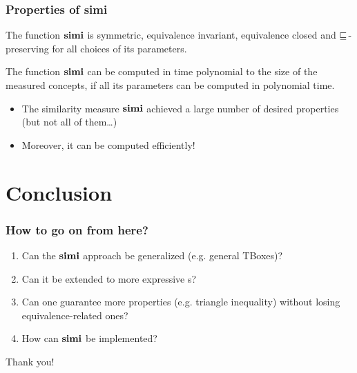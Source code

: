 \documentclass{beamer}
\begin{document}
\begin{frame}
  \frametitle{Properties of simi}
  \begin{theorem}
    The function \(\operatorname{\mathbf{simi}}\) is
    symmetric,
    equivalence invariant,
    equivalence closed and
    \(\sqsubseteq_{\mathcal{}}\)-preserving
    for all choices of its parameters.
  \end{theorem}
  \begin{theorem}
    The function \(\operatorname{\mathbf{simi}}\) can be computed in time
    polynomial to the size of the measured concepts,
    if all its parameters can be computed in polynomial time.
  \end{theorem}
  \begin{itemize}
    \item The similarity measure \(\operatorname{\mathbf{simi}}\)
    achieved a large number of desired properties
    (but not all of them\ldots)
    \item Moreover, it can be computed efficiently!
  \end{itemize}
\end{frame}

\section{Conclusion}

\begin{frame}
  \frametitle{How to go on from here?}
  \begin{enumerate}[<+->]
    \item Can the \(\operatorname{\mathbf{simi}}\) approach be generalized
    (e.g. general TBoxes)?
    \item Can it be extended to
    more expressive \dl{}s?
    \item Can one guarantee more properties
    (e.g. triangle inequality) without losing
    equivalence-related ones?
    \item How can \(\operatorname{\mathbf{simi}}\) be implemented?
  \end{enumerate}
\end{frame}

\begin{frame}[standout]
  Thank you!
\end{frame}
%
%
\end{document}
